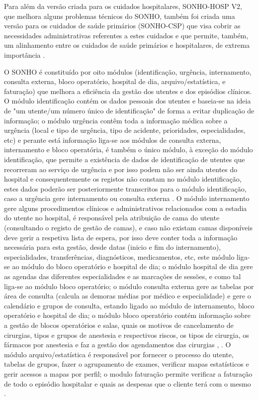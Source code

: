 \documentclass[conference]{IEEEtran}
\begin{document}
Para além da versão criada para os cuidados hospitalares, SONHO-HOSP V2, que melhora alguns problemas técnicos do SONHO, também foi criada uma versão para os cuidados de saúde primários (SONHO-CSP) que visa cobrir as necessidades administrativas referentes a estes cuidados e que permite, também, um alinhamento entre os cuidados de saúde primários e hospitalares, de extrema importância \cite{sonho}.

O SONHO é constituído por oito módulos (identificação, urgência, internamento, consulta externa, bloco operatório, hospital de dia, arquivo/estatística, e faturação) que melhora a eficiência da gestão dos utentes e dos episódios clínicos. O módulo identificação contém os dados pessoais dos utentes e baseia-se na ideia de "um utente/um número único de identificação" de forma a evitar duplicação de informação; o módulo urgência contêm toda a informação médica sobre a urgência (local e tipo de urgência, tipo de acidente, prioridades, especialidades, etc) e perante está informação liga-se aos módulos de consulta externa, internamento e bloco operatória, é também o único módulo, à exceção do módulo identificação, que permite a existência de dados de identificação de utentes que recorreram ao serviço de urgência e por isso podem não ser ainda utentes do hospital e consequentemente os registos não constam no módulo identificação, estes dados poderão ser posteriormente transcritos para o módulo identificação, caso a urgência gere internamento ou consulta externa \cite{sonho}. O módulo internamento gere alguns procedimentos clínicos e administrativos relacionados com a estadia do utente no hospital, é responsável pela atribuição de cama do utente (consultando o registo de gestão de camas), e caso não existam camas disponíveis deve gerir a respetiva lista de espera, por isso deve conter toda a informação necessária para esta gestão, desde datas (inicio e fim do internamento), especialidades, transferências, diagnósticos, medicamentos, etc, este módulo liga-se ao módulo do bloco operatório e hospital de dia; o módulo hospital de dia gere as agendas das diferentes especialidades e as marcações de sessões, e como tal liga-se ao módulo bloco operatório; o módulo consulta externa gere as tabelas por área de consulta (calcula as demoras médias por médico e especialidade) e gere o calendário e grupos de consulta, estando ligado ao módulo de internamento, bloco operatório e hospital de dia; o módulo bloco operatório contém  informação sobre a gestão de blocos operatórios e salas, quais os motivos de cancelamento de cirurgias,  tipos e grupos de anestesia e respectivos riscos, os tipos de cirurgia, os fármacos por anestesia e faz a gestão dos agendamentos das cirurgias \cite{sonho2013}, \cite{sonho}. O módulo arquivo/estatística é responsável por fornecer o processo do utente, tabelas de grupos, fazer o agrupamento de exames, verificar mapas estatísticos e gerir acessos a mapas por perfil; o modulo faturação permite verificar a faturação de todo o episódio hospitalar e quais as despesas que o cliente terá com o mesmo \cite{sonho}.
\end{document}

